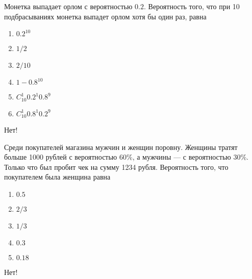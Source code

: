 \documentclass[t]{beamer}
\begin{document}
 \begin{frame} \label{7-No} 
\begin{block}{7} 

  Монетка выпадает орлом с вероятностью $0.2$. Вероятность того, что при 10 подбрасываниях монетка выпадет орлом хотя бы один раз, равна
  


 \end{block} 
\begin{enumerate} 
\item[] \hyperlink{7-No}{\beamergotobutton{} $0.2^10$}
\item[] \hyperlink{7-No}{\beamergotobutton{} $1/2$}
\item[] \hyperlink{7-No}{\beamergotobutton{} $2/10$}
\item[] \hyperlink{7-Yes}{\beamergotobutton{} $1 - 0.8^10$}
\item[] \hyperlink{7-No}{\beamergotobutton{} $C_{10}^1 0.2^{1}0.8^9$}
\item[] \hyperlink{7-No}{\beamergotobutton{} $C_{10}^1 0.8^{1}0.2^9$}
\end{enumerate} 

 \alert{Нет!} 
\end{frame} 


 \begin{frame} \label{8-No} 
\begin{block}{8} 

  Среди покупателей магазина мужчин и женщин поровну. Женщины тратят больше 1000 рублей с вероятностью 60\%, а мужчины — с вероятностью 30\%. Только что был пробит чек на сумму 1234 рубля. Вероятность того, что покупателем была женщина равна
  


 \end{block} 
\begin{enumerate} 
\item[] \hyperlink{8-No}{\beamergotobutton{} $0.5$}
\item[] \hyperlink{8-Yes}{\beamergotobutton{} $2/3$}
\item[] \hyperlink{8-No}{\beamergotobutton{} $1/3$}
\item[] \hyperlink{8-No}{\beamergotobutton{} $0.3$}
\item[] \hyperlink{8-No}{\beamergotobutton{} $0.18$}
\end{enumerate} 

 \alert{Нет!} 
\end{frame} 
\end{document}
